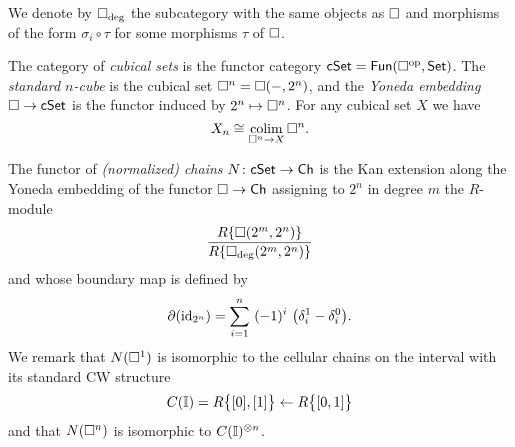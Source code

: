 We denote by $\square_{\deg}$ the subcategory with the same objects as $\square$ and morphisms of the form $\sigma_i \circ \tau$ for some morphisms $\tau$ of $\square$.

The category of \textit{cubical sets} is the functor category $\mathsf{cSet} = \mathsf{Fun}(\square^{\mathrm{op}}, \mathsf{Set})$.
The \textit{standard $n$-cube} is the cubical set $\square^n = \square(-, 2^n)$, and the \textit{Yoneda embedding} $\square \to \mathsf{cSet}$ is the functor induced by $2^n \mapsto \square^n$.
For any cubical set $X$ we have
\begin{equation*}
X_n \cong \operatorname*{colim}_{\square^n \to X} \square^n.
\end{equation*}

The functor of \textit{(normalized) chains} $N \colon \mathsf{cSet} \to \mathsf{Ch}$ is the Kan extension along the Yoneda embedding of the functor $\square \to \mathsf{Ch}$ assigning to $2^n$ in degree $m$ the $R$-module
\begin{equation*}
\frac{R\{\square(2^m, 2^n)\}}{R\{\square_{\deg}(2^m, 2^n)\}}
\end{equation*}
and whose boundary map is defined by
\begin{equation*}
\partial (\mathrm{id}_{2^n}) = \sum_{i=1}^{n} \ (-1)^i \
\big(\delta_i^1 - \delta_i^0 \big).
\end{equation*}
We remark that $N(\square^1)$ is isomorphic to the cellular chains on the interval with its standard CW structure
\begin{equation*}
C(\bm{\mathbb{I}}) = R \big\{ [0], [1] \big\} \leftarrow R \big\{ [0,1] \big\}
\end{equation*}
and that $N(\square^n)$ is isomorphic to $C(\bm{\mathbb{I}})^{\otimes n}$. 